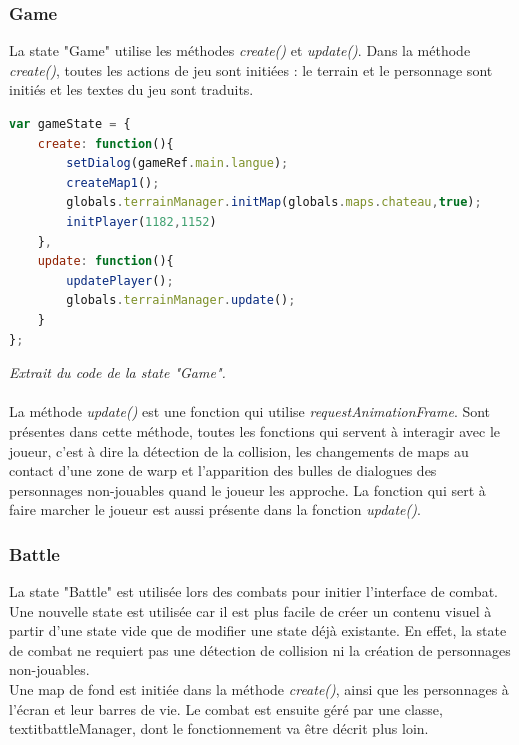 \documentclass[11pt]{article}
\begin{document}
\begin{appendices}
\subsubsection{Game}
La state "Game" utilise les méthodes \textit{create()} et \textit{update()}. Dans la méthode \textit{create()}, toutes les actions de jeu sont initiées : le terrain et le personnage sont initiés et les textes du jeu sont traduits.
\begin{lstlisting}[language=JavaScript]
var gameState = {
    create: function(){
        setDialog(gameRef.main.langue);
        createMap1();
        globals.terrainManager.initMap(globals.maps.chateau,true);
        initPlayer(1182,1152)
    },
    update: function(){
        updatePlayer();
        globals.terrainManager.update();
    }
};
\end{lstlisting} 
\textit{Extrait du code de la state "Game".}\\\\
La méthode \textit{update()} est une fonction qui utilise \textit{requestAnimationFrame}. Sont présentes dans cette méthode, toutes les fonctions qui servent à interagir avec le joueur, c'est à dire la détection de la collision, les changements de maps au contact d'une zone de warp et l'apparition des bulles de dialogues des personnages non-jouables quand le joueur les approche. La fonction qui sert à faire marcher le joueur est aussi présente dans la fonction \textit{update()}.
\subsubsection{Battle}
La state "Battle" est utilisée lors des combats pour initier l'interface de combat. Une nouvelle state est utilisée car il est plus facile de créer un contenu visuel à partir d'une state vide que de modifier une state déjà existante. En effet, la state de combat ne requiert pas une détection de collision ni la création de personnages non-jouables.\\

Une map de fond est initiée dans la méthode \textit{create()}, ainsi que les personnages à l'écran et leur barres de vie. Le combat est ensuite géré par une classe, textit{battleManager}, dont le fonctionnement va être décrit plus loin.

\end{appendices}
\end{document}
